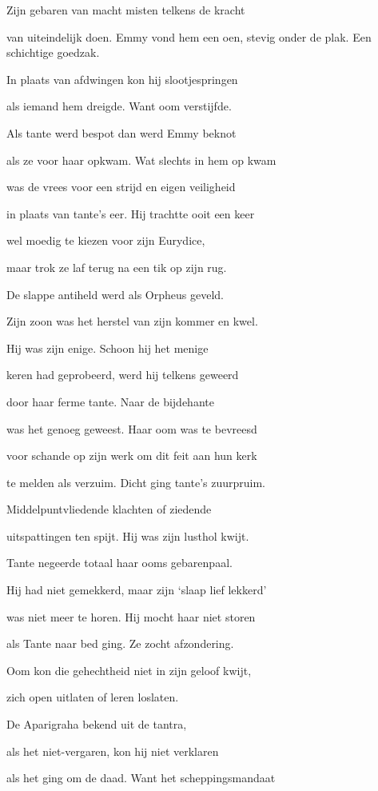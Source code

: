 Zijn gebaren van macht
misten telkens de kracht

van uiteindelijk doen.
Emmy vond hem een oen,
stevig onder de plak.
Een schichtige goedzak.

In plaats van afdwingen
kon hij slootjespringen

als iemand hem dreigde.
Want oom verstijfde.

Als tante werd bespot
dan werd Emmy beknot

als ze voor haar opkwam.
Wat slechts in hem op kwam

was de vrees voor een strijd
en eigen veiligheid

in plaats van tante’s eer.
Hij trachtte ooit een keer

wel moedig te kiezen
voor zijn Eurydice,

maar trok ze laf terug
na een tik op zijn rug.

De slappe antiheld
werd als Orpheus geveld.

Zijn zoon was het herstel
van zijn kommer en kwel.

Hij was zijn enige.
Schoon hij het menige

keren had geprobeerd,
werd hij telkens geweerd

door haar ferme tante.
Naar de bijdehante

was het genoeg geweest.
Haar oom was te bevreesd

voor schande op zijn werk
om dit feit aan hun kerk

te melden als verzuim.
Dicht ging tante’s zuurpruim.

Middelpuntvliedende
klachten of ziedende

uitspattingen ten spijt.
Hij was zijn lusthol kwijt.

Tante negeerde totaal
haar ooms gebarenpaal.

Hij had niet gemekkerd,
maar zijn ‘slaap lief lekkerd’

was niet meer te horen.
Hij mocht haar niet storen

als Tante naar bed ging.
Ze zocht afzondering.

Oom kon die gehechtheid
niet in zijn geloof kwijt,

zich open uitlaten
of leren loslaten.

De Aparigraha
bekend uit de tantra,

als het niet-vergaren,
kon hij niet verklaren

als het ging om de daad.
Want het scheppingsmandaat

